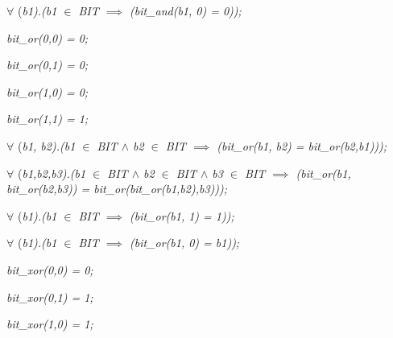 \begin{sloppypar}
\hspace*{0.20in} $\forall$ \rm (\it b1\rm )\rm .\rm (\it b1  $\in$  \it BIT  $\implies$  \rm (\it bit\_and\rm (\it b1\rm , \rm 0\rm ) \rm = \rm 0\rm )\rm )\rm ;

\vspace*{4mm}
\hspace*{0.20in}\it bit\_or\rm (\rm 0\rm ,\rm 0\rm ) \rm = \rm 0\rm ;

\hspace*{0.20in}\it bit\_or\rm (\rm 0\rm ,\rm 1\rm ) \rm = \rm 0\rm ;

\hspace*{0.20in}\it bit\_or\rm (\rm 1\rm ,\rm 0\rm ) \rm = \rm 0\rm ;

\hspace*{0.20in}\it bit\_or\rm (\rm 1\rm ,\rm 1\rm ) \rm = \rm 1\rm ;

\hspace*{0.20in} $\forall$ \rm (\it b1\rm , \it b2\rm )\rm .\rm (\it b1  $\in$  \it BIT  $\land$  \it b2  $\in$  \it BIT  $\implies$  \rm (\it bit\_or\rm (\it b1\rm , \it b2\rm ) \rm = \it bit\_or\rm (\it b2\rm ,\it b1\rm )\rm )\rm )\rm ;

\hspace*{0.20in} $\forall$ \rm (\it b1\rm ,\it b2\rm ,\it b3\rm )\rm .\rm (\it b1  $\in$  \it BIT  $\land$  \it b2  $\in$  \it BIT  $\land$  \it b3  $\in$  \it BIT  $\implies$  \rm (\it bit\_or\rm (\it b1\rm , \it bit\_or\rm (\it b2\rm ,\it b3\rm )\rm ) \rm = \it bit\_or\rm (\it bit\_or\rm (\it b1\rm ,\it b2\rm )\rm ,\it b3\rm )\rm )\rm )\rm ;

\hspace*{0.20in} $\forall$ \rm (\it b1\rm )\rm .\rm (\it b1  $\in$  \it BIT  $\implies$  \rm (\it bit\_or\rm (\it b1\rm , \rm 1\rm ) \rm = \rm 1\rm )\rm )\rm ;

\hspace*{0.20in} $\forall$ \rm (\it b1\rm )\rm .\rm (\it b1  $\in$  \it BIT  $\implies$  \rm (\it bit\_or\rm (\it b1\rm , \rm 0\rm ) \rm = \it b1\rm )\rm )\rm ;

\vspace*{4mm}
\hspace*{0.20in}\it bit\_xor\rm (\rm 0\rm ,\rm 0\rm ) \rm = \rm 0\rm ;

\hspace*{0.20in}\it bit\_xor\rm (\rm 0\rm ,\rm 1\rm ) \rm = \rm 1\rm ;

\hspace*{0.20in}\it bit\_xor\rm (\rm 1\rm ,\rm 0\rm ) \rm = \rm 1\rm ;


\end{sloppypar}
